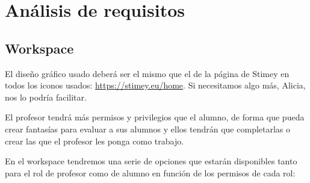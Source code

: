 \chapter{Análisis de requisitos}
\section{Workspace}
El diseño gráfico usado deberá ser el mismo que el de la página de Stimey en todos los iconos usados: \url{https://stimey.eu/home}. Si necesitamos algo más, Alicia, nos lo podría facilitar.

El profesor tendrá más permisos y privilegios que el alumno, de forma que pueda crear fantasías para evaluar a sus alumnos y ellos tendrán que completarlas o crear las que el profesor les ponga como trabajo.

En el workspace tendremos una serie de opciones que estarán disponibles tanto para el rol de profesor como de alumno en función de los permisos de cada rol:
